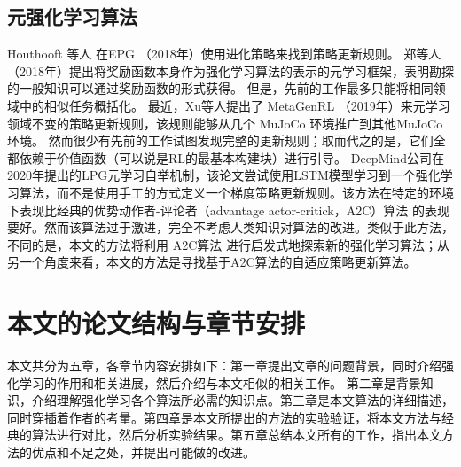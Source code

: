 \subsection{元强化学习算法}
Houthooft 等人 在EPG \cite{houthooftEvolvedPolicyGradients2018} （2018年）使用进化策略来找到策略更新规则。
郑等人 \cite{zhengWhatCanLearned2020}（2018年）提出将奖励函数本身作为强化学习算法的表示的元学习框架，表明勘探的一般知识可以通过奖励函数的形式获得。
但是，先前的工作最多只能将相同领域中的相似任务概括化。
最近，Xu等人提出了 MetaGenRL \cite{kirschImprovingGeneralizationMeta2019} （2019年）来元学习领域不变的策略更新规则，该规则能够从几个 MuJoCo 环境推广到其他MuJoCo环境。
然而很少有先前的工作试图发现完整的更新规则；取而代之的是，它们全都依赖于价值函数（可以说是RL的最基本构建块）进行引导。
DeepMind公司在2020年提出的LPG元学习自举机制\cite{ohDiscoveringReinforcementLearning2020}，该论文尝试使用LSTM模型学习到一个强化学习算法，而不是使用手工的方式定义一个梯度策略更新规则。该方法在特定的环境下表现比经典的优势动作者-评论者（advantage actor-critick，A2C）算法 \cite{mnihAsynchronousMethodsDeep2016} 的表现要好。然而该算法过于激进，完全不考虑人类知识对算法的改进。类似于此方法，不同的是，本文的方法将利用 A2C算法 进行启发式地探索新的强化学习算法；从另一个角度来看，本文的方法是寻找基于A2C算法的自适应策略更新算法。



\section{本文的论文结构与章节安排}
\label{sec:arrangement}

本文共分为五章，各章节内容安排如下：第一章提出文章的问题背景，同时介绍强化学习的作用和相关进展，然后介绍与本文相似的相关工作。 第二章是背景知识，介绍理解强化学习各个算法所必需的知识点。第三章是本文算法的详细描述，同时穿插着作者的考量。第四章是本文所提出的方法的实验验证，将本文方法与经典的算法进行对比，然后分析实验结果。第五章总结本文所有的工作，指出本文方法的优点和不足之处，并提出可能做的改进。
